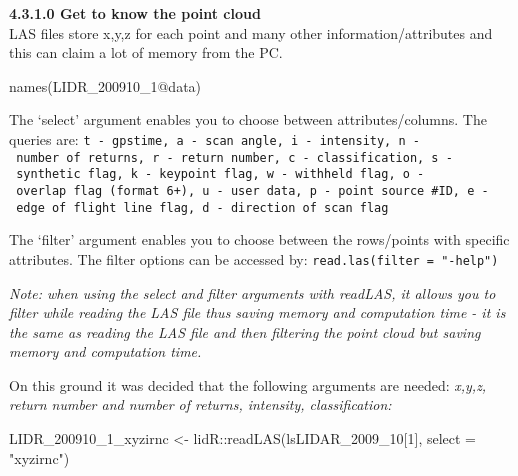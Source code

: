 \documentclass[
  12pt,
]{article}
\newenvironment{Shaded}{\begin{snugshade}}{\end{snugshade}}
\newcommand{\AttributeTok}[1]{\textcolor[rgb]{0.77,0.63,0.00}{#1}}
\newcommand{\DecValTok}[1]{\textcolor[rgb]{0.00,0.00,0.81}{#1}}
\newcommand{\FunctionTok}[1]{\textcolor[rgb]{0.00,0.00,0.00}{#1}}
\newcommand{\NormalTok}[1]{#1}
\newcommand{\OtherTok}[1]{\textcolor[rgb]{0.56,0.35,0.01}{#1}}
\newcommand{\SpecialCharTok}[1]{\textcolor[rgb]{0.00,0.00,0.00}{#1}}
\newcommand{\StringTok}[1]{\textcolor[rgb]{0.31,0.60,0.02}{#1}}
\begin{document}
\textbf{4.3.1.0 Get to know the point cloud}\\
\newline
LAS files store x,y,z for each point and many other information/attributes and this can claim a lot of memory from the PC.

\begin{Shaded}
\begin{Highlighting}[]
\FunctionTok{names}\NormalTok{(LIDR\_200910\_1}\SpecialCharTok{@}\NormalTok{data)}
\end{Highlighting}
\end{Shaded}

The `select' argument enables you to choose between attributes/columns. The queries are:
\newline
\texttt{t\ -\ gpstime,\ a\ -\ scan\ angle,\ i\ -\ intensity,\ n\ -\ number\ of\ returns,\ r\ -\ return\ number,\ c\ -\ classification,\ s\ -\ synthetic\ flag,\ k\ -\ keypoint\ flag,\ w\ -\ withheld\ flag,\ o\ -\ overlap\ flag\ (format\ 6+),\ u\ -\ user\ data,\ p\ -\ point\ source\ \#ID,\ e\ -\ edge\ of\ flight\ line\ flag,\ d\ -\ direction\ of\ scan\ flag}

The `filter' argument enables you to choose between the rows/points with specific attributes. The filter options can be accessed by: \texttt{read.las(filter\ =\ "-help")}

\emph{Note: when using the select and filter arguments with readLAS, it allows you to filter while reading the LAS file thus saving memory and computation time - it is the same as reading the LAS file and then filtering the point cloud but saving memory and computation time.}

On this ground it was decided that the following arguments are needed: \emph{x,y,z, return number and number of returns, intensity, classification:}

\begin{Shaded}
\begin{Highlighting}[]
\NormalTok{LIDR\_200910\_1\_xyzirnc }\OtherTok{\textless{}{-}}\NormalTok{ lidR}\SpecialCharTok{::}\FunctionTok{readLAS}\NormalTok{(lsLIDAR\_2009\_10[}\DecValTok{1}\NormalTok{], }\AttributeTok{select =} \StringTok{"xyzirnc"}\NormalTok{)}
\end{Highlighting}
\end{Shaded}
\end{document}
